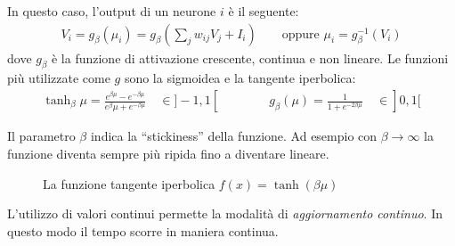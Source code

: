 In questo caso, l'output di un neurone $i$ è il seguente:
\begin{align}
    V_i = g_\beta(\mu_i) = g_\beta \left(\sum_{j} w_{ij} V_j + I_i \right) \qquad \text{oppure } \mu_i = g^{-1}_\beta(V_i) \label{eq:vi}
\end{align}
dove $g_\beta$ è la funzione di attivazione crescente, continua e non lineare. Le funzioni più utilizzate come $g$ sono la sigmoidea e la tangente iperbolica:
\begin{align*}
    \tanh_\beta \mu = \frac {e^{\beta\mu} - e^{-\beta\mu}} {e^\beta\mu + e^{-\beta\mu}} \quad\in ]-1,1[
    \qquad\qquad
    g_\beta(\mu) =\frac{1}{1 + e^{-2 \beta \mu}} \quad\in ]0,1[
\end{align*}

Il parametro $\beta$ indica la “stickiness” della funzione. Ad esempio con $\beta \rightarrow \infty$ la funzione diventa sempre più ripida fino a diventare lineare.\\

\begin{figure}[h!]
    \centering
    \caption{La funzione tangente iperbolica $f(x) = \tanh(\beta \mu)$}\label{fig:stickiness}
\end{figure}

\newpage

L'utilizzo di valori continui permette la modalità di \emph{aggiornamento continuo}. In questo modo il tempo scorre in maniera continua. 

